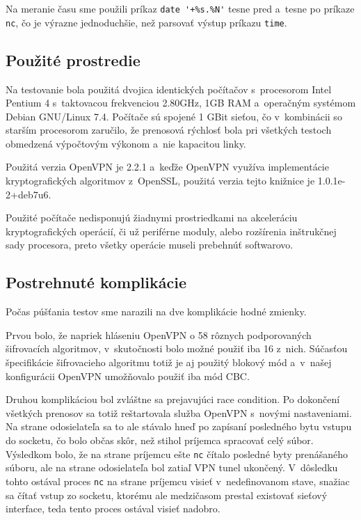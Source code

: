 \documentclass[12pt,a4paper]{article}
\begin{document}
Na meranie času sme použili príkaz \verb|date '+%s.%N'| tesne pred a~tesne
po príkaze \verb|nc|, čo je výrazne jednoduchšie, než parsovať výstup
príkazu \verb|time|.

\subsection{Použité prostredie}

Na testovanie bola použitá dvojica identických počítačov s~procesorom
Intel Pentium 4 s~taktovacou frekvenciou 2.80GHz, 1GB RAM a~operačným
systémom Debian GNU/Linux 7.4. Počítače sú spojené 1 GBit sieťou, čo
v~kombinácii so starším procesorom zaručilo, že prenosová rýchlosť bola
pri všetkých testoch obmedzená výpočtovým výkonom a~nie kapacitou linky.

Použitá verzia OpenVPN je 2.2.1 a~keďže OpenVPN využíva implementácie
kryptografických algoritmov z~OpenSSL, použitá verzia tejto knižnice je
1.0.1e-2+deb7u6.

Použité počítače nedisponujú žiadnymi prostriedkami na akceleráciu
kryptografických operácií, či už periférne moduly, alebo rozšírenia
inštrukčnej sady procesora, preto všetky operácie museli prebehnúť
softwarovo.

\subsection{Postrehnuté komplikácie} %

Počas púšťania testov sme narazili na dve komplikácie hodné zmienky.

Prvou bolo, že napriek hláseniu OpenVPN o 58 rôznych podporovaných
šifrovacích algoritmov, v~skutočnosti bolo možné použiť iba 16 z~nich.
Súčasťou špecifikácie šifrovacieho algoritmu totiž je aj použitý blokový
mód a~v~našej konfigurácii OpenVPN umožňovalo použiť iba mód CBC.

Druhou komplikáciou bol zvláštne sa prejavujúci race condition. Po
dokončení všetkých prenosov sa totiž reštartovala služba OpenVPN s~novými
nastaveniami. Na strane odosielateľa sa to ale stávalo hneď po zapísaní
posledného bytu vstupu do socketu, čo bolo občas skôr, než stihol príjemca
spracovať celý súbor. Výsledkom bolo, že na strane príjemcu ešte \verb|nc|
čítalo posledné byty prenášaného súboru, ale na strane odosielateľa bol
zatiaľ VPN tunel ukončený. V~dôsledku tohto ostával proces \verb|nc| na
strane príjemcu visieť v~nedefinovanom stave, snažiac sa čítať vstup zo
socketu, ktorému ale medzičasom prestal existovať sieťový interface, teda
tento proces ostával visieť nadobro.
\end{document}
